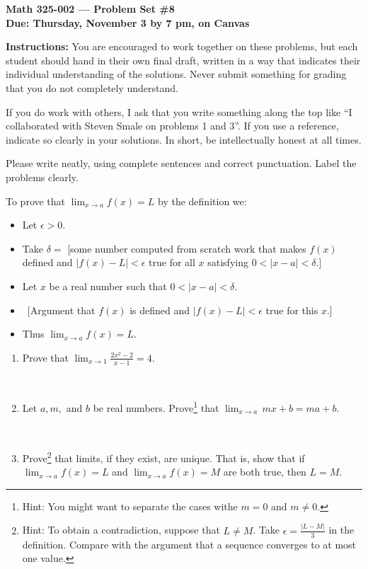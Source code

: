 \documentclass{amsart}
\def\e{\varepsilon}
\def\ds{\displaystyle}
\def\e{\epsilon}
\def\d{\delta}
\begin{document}
\begin{center}
{\large\bfseries
Math 325-002 --- Problem Set \#8 \\
Due: Thursday, November 3 by 7 pm, on Canvas}
\end{center}





{\bf Instructions:} You are encouraged to work together on these
problems, but each student should hand in their own final draft,
written in a way that indicates their individual understanding of
the solutions. Never submit something for grading
that you do not completely understand. 

If you do work with others, I ask that you write something along the
top like ``I collaborated with Steven Smale on problems 1 and 3''.
If you use a reference, indicate so clearly in your solutions. 
In short, be intellectually
honest at all times.

Please write neatly, using complete sentences and correct
punctuation. Label the problems clearly. 


\begin{framed}To prove that $\ds \lim_{x\to a} f(x) = L$ by the definition we:
\begin{itemize}
\item Let $\e>0$.
\item Take $\d =$ [some number computed from scratch work that makes $f(x)$ defined and $|f(x)-L|<\e$ true for all $x$ satisfying $0<|x-a|<\d$.]
\item Let $x$ be a real number such that $0< |x-a|< \d$.
\item \, [Argument that $f(x)$ is defined and $|f(x)-L|<\e$ true for this $x$.]
\item Thus $\lim_{x\to a} f(x) = L$.
\end{itemize}
\end{framed}


\begin{enumerate}

\item Prove that $\ds \lim_{x\to 1} \frac{2x^2 - 2}{x-1} = 4$.

\

\item Let $a,m,$ and $b$ be real numbers. Prove\footnote{Hint: You might want to separate the cases withe $m=0$ and $m\neq 0$.} that $\ds \lim_{x\to a} \, mx+b = ma+b$.

\

\item Prove\footnote{Hint: To obtain a contradiction, suppose that $L\neq M$. Take $\e= \frac{|L-M|}{3}$ in the definition. Compare with the argument that a sequence converges to at most one value.} that limits, if they exist, are unique. That is, show that if $\ds \lim_{x\to a} f(x) = L$ and $\ds \lim_{x\to a} f(x) = M$ are both true, then $L=M$.

\end{enumerate}
\end{document}
